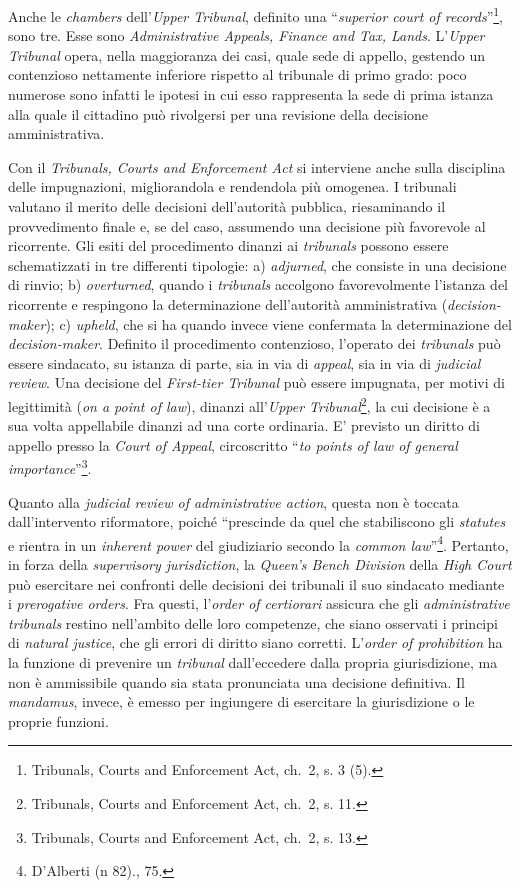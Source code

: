 \documentclass[12pt,it,a4paper,]{report}
\begin{document}
Anche le \emph{chambers} dell'\emph{Upper Tribunal}, definito una
``\emph{superior court of records}''\footnote{Tribunals, Courts and
  Enforcement Act, ch.~2, s. 3 (5).}, sono tre. Esse sono
\emph{Administrative Appeals, Finance and Tax, Lands}. L'\emph{Upper
Tribunal} opera, nella maggioranza dei casi, quale sede di appello,
gestendo un contenzioso nettamente inferiore rispetto al tribunale di
primo grado: poco numerose sono infatti le ipotesi in cui esso
rappresenta la sede di prima istanza alla quale il cittadino può
rivolgersi per una revisione della decisione amministrativa.

Con il \emph{Tribunals, Courts and Enforcement Act} si interviene anche
sulla disciplina delle impugnazioni, migliorandola e rendendola più
omogenea. I tribunali valutano il merito delle decisioni dell'autorità
pubblica, riesaminando il provvedimento finale e, se del caso, assumendo
una decisione più favorevole al ricorrente. Gli esiti del procedimento
dinanzi ai \emph{tribunals} possono essere schematizzati in tre
differenti tipologie: a) \emph{adjurned}, che consiste in una decisione
di rinvio; b) \emph{overturned}, quando i \emph{tribunals} accolgono
favorevolmente l'istanza del ricorrente e respingono la determinazione
dell'autorità amministrativa (\emph{decision-maker}); c) \emph{upheld},
che si ha quando invece viene confermata la determinazione del
\emph{decision-maker}. Definito il procedimento contenzioso, l'operato
dei \emph{tribunals} può essere sindacato, su istanza di parte, sia in
via di \emph{appeal}, sia in via di \emph{judicial review}. Una
decisione del \emph{First-tier Tribunal} può essere impugnata, per
motivi di legittimità (\emph{on a point of law}), dinanzi
all'\emph{Upper Tribunal}\footnote{Tribunals, Courts and Enforcement
  Act, ch.~2, s. 11.}, la cui decisione è a sua volta appellabile
dinanzi ad una corte ordinaria. E' previsto un diritto di appello presso
la \emph{Court of Appeal}, circoscritto ``\emph{to points of law of
general importance}''\footnote{Tribunals, Courts and Enforcement Act,
  ch.~2, s. 13.}.

Quanto alla \emph{judicial review of administrative action}, questa non
è toccata dall'intervento riformatore, poiché ``prescinde da quel che
stabiliscono gli \emph{statutes} e rientra in un \emph{inherent power}
del giudiziario secondo la \emph{common law}''\footnote{{D'Alberti (n
  82).}, 75.}. Pertanto, in forza della \emph{supervisory jurisdiction},
la \emph{Queen's Bench Division} della \emph{High Court} può esercitare
nei confronti delle decisioni dei tribunali il suo sindacato mediante i
\emph{prerogative orders}. Fra questi, l'\emph{order of certiorari}
assicura che gli \emph{administrative tribunals} restino nell'ambito
delle loro competenze, che siano osservati i principi di \emph{natural
justice}, che gli errori di diritto siano corretti. L'\emph{order of
prohibition} ha la funzione di prevenire un \emph{tribunal}
dall'eccedere dalla propria giurisdizione, ma non è ammissibile quando
sia stata pronunciata una decisione definitiva. Il \emph{mandamus},
invece, è emesso per ingiungere di esercitare la giurisdizione o le
proprie funzioni.
\end{document}
